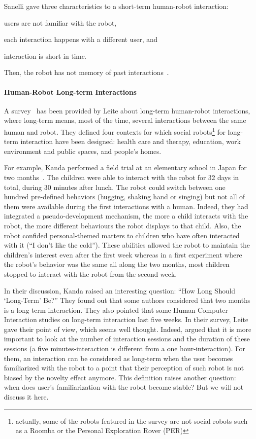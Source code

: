 \documentclass[a4paper,11pt,twoside]{StyleThese}
\begin{document}
Sanelli \etal{} gave three characteristics to a short-term human-robot interaction: 
\begin{inlineEnumerate}
	\item users are not familiar with the robot,
	\item each interaction happens with a different user, and
	\item interaction is short in time.
\end{inlineEnumerate} Then, the robot has not memory of past interactions~\cite{sanelli_2017_short}.

\paragraph{Human-Robot Long-term Interactions}
A survey~\cite{leite_2013_social} has been provided by Leite \etal{} about long-term human-robot interactions, where long-term means, most of the time, several interactions between the same human and robot. They defined four contexts for which social robots\footnote{actually, some of the robots featured in the survey are not social robots such as a Roomba or the Personal Exploration Rover (PER)} for long-term interaction have been designed: health care and therapy, education, work environment and public spaces, and people's homes. 

For example, Kanda \etal{} performed a field trial at an elementary school in Japan for two months~\cite{kanda_2007_two}. The children were able to interact with the robot for 32 days in total, during 30 minutes after lunch. The robot could switch between one hundred pre-defined behaviors (\eg hugging, shaking hand or singing) but not all of them were available during the first interactions with a human. Indeed, they had integrated a pseudo-development mechanism, \ie the more a child interacts with the robot, the more different behaviours the robot displays to that child. Also, the robot confided personal-themed matters to children who have often interacted with it (\eg ``I don't like the cold''). These abilities allowed the robot to maintain the children's interest even after the first week whereas in a first experiment where the robot's behavior was the same all along the two months, most children stopped to interact with the robot from the second week. 

In their discussion, Kanda \etal{} raised an interesting question: ``How Long Should \textquoteleft Long-Term\textquoteright{} Be?'' They found out that some authors considered that two months is a long-term interaction. They also pointed that some Human-Computer Interaction studies on long-term interaction last five weeks. In their survey, Leite \etal{} gave their point of view, which seems well thought. Indeed, argued that it is more important to look at the number of interaction sessions and the duration of these sessions (a five minutes-interaction is different from a one hour-interaction). For them, an interaction can be considered as long-term when the user becomes familiarized with the robot to a point that their perception of such robot is not biased by the novelty effect anymore. This definition raises another question: when does user’s familiarization with the robot become stable? But we will not discuss it here.
\end{document}
